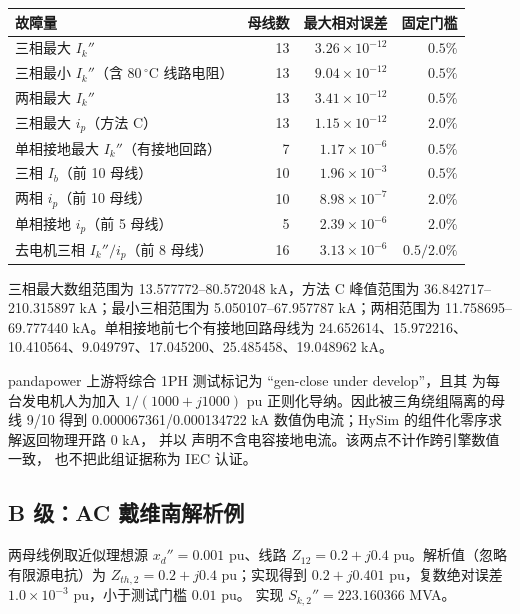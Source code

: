 \begin{center}\footnotesize
\begin{tabular}{@{}L{4.5cm}r r r@{}}
\toprule
故障量 & 母线数 & 最大相对误差 & 固定门槛\\
\midrule
三相最大 $I_k''$ & 13 & $3.26\times10^{-12}$ & $0.5\%$\\
三相最小 $I_k''$（含 80\,$^\circ$C 线路电阻） & 13 & $9.04\times10^{-12}$ & $0.5\%$\\
两相最大 $I_k''$ & 13 & $3.41\times10^{-12}$ & $0.5\%$\\
三相最大 $i_p$（方法 C） & 13 & $1.15\times10^{-12}$ & $2.0\%$\\
单相接地最大 $I_k''$（有接地回路） & 7 & $1.17\times10^{-6}$ & $0.5\%$\\
三相 $I_b$（前 10 母线） & 10 & $1.96\times10^{-3}$ & $0.5\%$\\
两相 $i_p$（前 10 母线） & 10 & $8.98\times10^{-7}$ & $2.0\%$\\
单相接地 $i_p$（前 5 母线） & 5 & $2.39\times10^{-6}$ & $2.0\%$\\
去电机三相 $I_k''/i_p$（前 8 母线） & 16 & $3.13\times10^{-6}$ & $0.5/2.0\%$\\
\bottomrule
\end{tabular}
\end{center}

三相最大数组范围为 13.577772--80.572048 kA，方法 C 峰值范围为
36.842717--210.315897 kA；最小三相范围为 5.050107--67.957787 kA；两相范围为
11.758695--69.777440 kA。单相接地前七个有接地回路母线为
24.652614、15.972216、10.410564、9.049797、17.045200、25.485458、19.048962 kA。

pandapower 上游将综合 1PH 测试标记为 ``gen-close under develop''，且其
 为每台发电机人为加入
$1/(1000+j1000)$ pu 正则化导纳。因此被三角绕组隔离的母线 9/10 得到
0.000067361/0.000134722 kA 数值伪电流；HySim 的组件化零序求解返回物理开路 0 kA，
并以  声明不含电容接地电流。该两点不计作跨引擎数值一致，
也不把此组证据称为 IEC 认证。

\subsection{B 级：AC 戴维南解析例}

两母线例取近似理想源 $x_d''=0.001$ pu、线路
$Z_{12}=0.2+j0.4$ pu。解析值（忽略有限源电抗）为 $Z_{th,2}=0.2+j0.4$ pu；实现得到
$0.2+j0.401$ pu，复数绝对误差 $1.0\times10^{-3}$ pu，小于测试门槛 $0.01$ pu。
实现 $S_{k,2}''=223.160366$ MVA。

